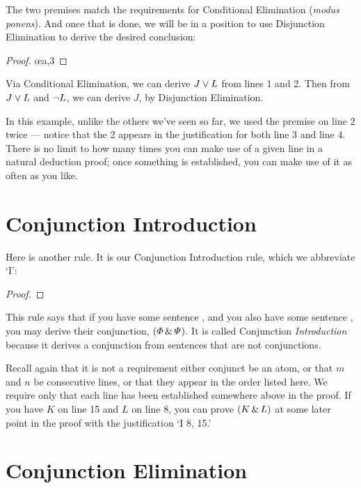 The two premises match the requirements for Conditional Elimination (\emph{modus ponens}). And once that is done, we will be in a position to use Disjunction Elimination to derive the desired conclusion:

\begin{proof}
	  
	 
	 \oe{a,3}
\end{proof}

Via Conditional Elimination, we can derive $J \vee L$ from lines 1 and 2. Then from $J \vee L$ and $\neg L$, we can derive $J$, by Disjunction Elimination.

In this example, unlike the others we've seen so far, we used the premise on line 2 twice --- notice that the 2 appears in the justification for both line 3 and line 4. There is no limit to how many times you can make use of a given line in a natural deduction proof; once something is established, you can make use of it as often as you like.

\section{Conjunction Introduction}

Here is another rule. It is our Conjunction Introduction rule, which we abbreviate `{\eand}I':

\begin{proof}
	\metaA{}
	\metaB{}
	 
\end{proof}

This rule says that if you have some sentence \metaA{}, and you also have some sentence \metaB{}, you may derive their conjunction, $(\varPhi{} \,\&\, \varPsi{})$. It is called Conjunction \emph{Introduction} because it derives a conjunction from sentences that are not conjunctions.

Recall again that it is not a requirement either conjunct be an atom, or that $m$ and $n$ be consecutive lines, or that they appear in the order listed here. We require only that each line has been established somewhere above in the proof. If you have $K$ on line 15 and $L$ on line 8, you can prove $(K\,\&\, L)$ at some later point in the proof with the justification `{\eand}I 8, 15.'

\section{Conjunction Elimination}

